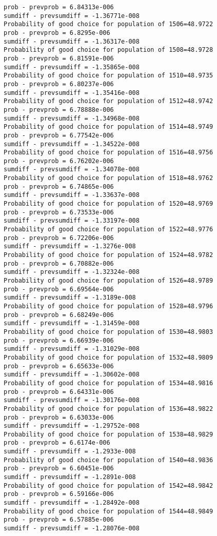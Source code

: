 \documentclass[11pt,onecolumn]{article}
\begin{document}
\begin{verbatim}
prob - prevprob = 6.84313e-006
sumdiff - prevsumdiff = -1.36771e-008
Probability of good choice for population of 1506=48.9722
prob - prevprob = 6.8295e-006
sumdiff - prevsumdiff = -1.36317e-008
Probability of good choice for population of 1508=48.9728
prob - prevprob = 6.81591e-006
sumdiff - prevsumdiff = -1.35865e-008
Probability of good choice for population of 1510=48.9735
prob - prevprob = 6.80237e-006
sumdiff - prevsumdiff = -1.35416e-008
Probability of good choice for population of 1512=48.9742
prob - prevprob = 6.78888e-006
sumdiff - prevsumdiff = -1.34968e-008
Probability of good choice for population of 1514=48.9749
prob - prevprob = 6.77542e-006
sumdiff - prevsumdiff = -1.34522e-008
Probability of good choice for population of 1516=48.9756
prob - prevprob = 6.76202e-006
sumdiff - prevsumdiff = -1.34078e-008
Probability of good choice for population of 1518=48.9762
prob - prevprob = 6.74865e-006
sumdiff - prevsumdiff = -1.33637e-008
Probability of good choice for population of 1520=48.9769
prob - prevprob = 6.73533e-006
sumdiff - prevsumdiff = -1.33197e-008
Probability of good choice for population of 1522=48.9776
prob - prevprob = 6.72206e-006
sumdiff - prevsumdiff = -1.3276e-008
Probability of good choice for population of 1524=48.9782
prob - prevprob = 6.70882e-006
sumdiff - prevsumdiff = -1.32324e-008
Probability of good choice for population of 1526=48.9789
prob - prevprob = 6.69564e-006
sumdiff - prevsumdiff = -1.3189e-008
Probability of good choice for population of 1528=48.9796
prob - prevprob = 6.68249e-006
sumdiff - prevsumdiff = -1.31459e-008
Probability of good choice for population of 1530=48.9803
prob - prevprob = 6.66939e-006
sumdiff - prevsumdiff = -1.31029e-008
Probability of good choice for population of 1532=48.9809
prob - prevprob = 6.65633e-006
sumdiff - prevsumdiff = -1.30602e-008
Probability of good choice for population of 1534=48.9816
prob - prevprob = 6.64331e-006
sumdiff - prevsumdiff = -1.30176e-008
Probability of good choice for population of 1536=48.9822
prob - prevprob = 6.63033e-006
sumdiff - prevsumdiff = -1.29752e-008
Probability of good choice for population of 1538=48.9829
prob - prevprob = 6.6174e-006
sumdiff - prevsumdiff = -1.2933e-008
Probability of good choice for population of 1540=48.9836
prob - prevprob = 6.60451e-006
sumdiff - prevsumdiff = -1.2891e-008
Probability of good choice for population of 1542=48.9842
prob - prevprob = 6.59166e-006
sumdiff - prevsumdiff = -1.28492e-008
Probability of good choice for population of 1544=48.9849
prob - prevprob = 6.57885e-006
sumdiff - prevsumdiff = -1.28076e-008

\end{verbatim}
\end{document}
